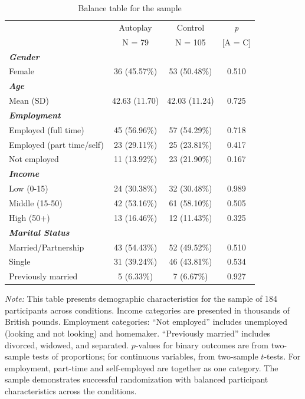 \documentclass[11pt,a4paper,oneside]{article}
\begin{document}
\begin{table}[H]
 \centering
 \begin{threeparttable}
 \caption{Balance table for the sample}
 \begin{tabular*}{\textwidth}{@{\extracolsep{\fill}}lcc c@{}}
 \toprule
 & \multicolumn{1}{c}{Autoplay} & \multicolumn{1}{c}{Control} & \multicolumn{1}{c}{\textit{p}} \\
 & \multicolumn{1}{c}{N = 79} & \multicolumn{1}{c}{N = 105} & [A = C]\\
 \midrule
 \textit{\textbf{Gender}} & & & \\
 Female & 36 (45.57\%) & 53 (50.48\%) & 0.510 \\ \midrule
 \textit{\textbf{Age}} & & & \\
 Mean (SD) & 42.63 (11.70) & 42.03 (11.24) & 0.725 \\ \midrule
 \textit{\textbf{Employment}} & & & \\
 Employed (full time) & 45 (56.96\%) & 57 (54.29\%) & 0.718 \\
 Employed (part time/self) & 23 (29.11\%) & 25 (23.81\%) & 0.417 \\
 Not employed & 11 (13.92\%) & 23 (21.90\%) & 0.167 \\ \midrule
 \textit{\textbf{Income}} & & & \\
 Low (0-15) & 24 (30.38\%) & 32 (30.48\%) & 0.989 \\
 Middle (15-50) & 42 (53.16\%) & 61 (58.10\%) & 0.505 \\
 High (50+) & 13 (16.46\%) & 12 (11.43\%) & 0.325 \\ \midrule
 \textit{\textbf{Marital Status}} & & & \\ 
 Married/Partnership & 43 (54.43\%) & 52 (49.52\%) & 0.510 \\
 Single & 31 (39.24\%) & 46 (43.81\%) & 0.534 \\
 Previously married & 5 (6.33\%) & 7 (6.67\%) & 0.927 \\
 \bottomrule
 \end{tabular*}
 \begin{tablenotes}[flushleft]
 \footnotesize
 \item[] \textit{Note:} This table presents demographic characteristics for the sample of 184 participants across conditions. Income categories are presented in thousands of British pounds. Employment categories: ``Not employed'' includes unemployed (looking and not looking) and homemaker. ``Previously married'' includes divorced, widowed, and separated. $p$-values for binary outcomes are from two-sample tests of proportions; for continuous variables, from two-sample $t$-tests. For employment, part-time and self-employed are together as one category. The sample demonstrates successful randomization with balanced participant characteristics across the conditions.
 \end{tablenotes}
 \label{table2}
 \end{threeparttable}
\end{table}
\end{document}
